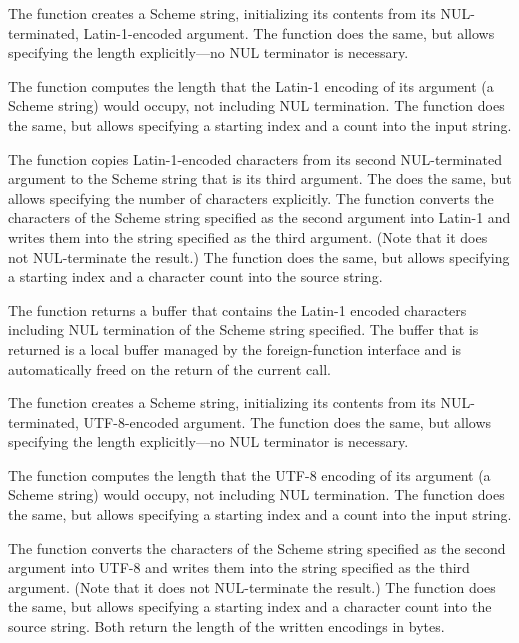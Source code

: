 %
The  function creates a Scheme
string, initializing its contents from its NUL-terminated,
Latin-1-encoded argument.  The 
function does the same, but allows specifying the length explicitly---no NUL
terminator is necessary.

The  function computes the
length that the Latin-1 encoding of its argument (a Scheme string)
would occupy, not including NUL termination.  The
 function does the same, but
allows specifying a starting index and a count into the input string.

The  function copies
Latin-1-encoded characters from its second NUL-terminated argument to
the Scheme string that is its third argument.  The
 does the same, but allows
specifying the number of characters explicitly.  The
 function converts the
characters of the Scheme string specified as the second argument into
Latin-1 and writes them into the string specified as the third
argument.  (Note that it does not NUL-terminate the result.)  The
 function does the same, but
allows specifying a starting index and a character count into the
source string.

The  function returns a
buffer that contains the Latin-1 encoded characters including NUL
termination of the Scheme string specified.  The buffer that is
returned is a local buffer managed by the foreign-function interface
and is automatically freed on the return of the current call.

The  function creates a Scheme
string, initializing its contents from its NUL-terminated,
UTF-8-encoded argument.  The 
function does the same, but allows specifying the length
explicitly---no NUL terminator is necessary.

The  function computes the length
that the UTF-8 encoding of its argument (a Scheme string) would
occupy, not including NUL termination.  The
 function does the same, but allows
specifying a starting index and a count into the input string.

The  function converts the
characters of the Scheme string specified as the second argument into
UTF-8 and writes them into the string specified as the third
argument.  (Note that it does not NUL-terminate the result.)  The
 function does the same, but
allows specifying a starting index and a character count into the
source string.  Both return the length of the written encodings in
bytes.

